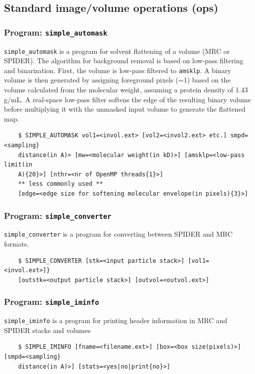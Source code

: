\documentclass[a4paper,11pt]{article}
\newcommand{\prgname}[1]{\textcolor{NavyBlue}{\texttt{#1}}}
\begin{document}
\subsection{Standard image/volume operations (ops)}

\subsubsection{Program: \prgname{simple\_automask}}
\label{automask}
\prgname{simple\_automask} is a program for solvent flattening of a volume (MRC or SPIDER). The algorithm for background removal is based on low-pass filtering and binarization. First, the volume is low-pass filtered to \texttt{amsklp}. A binary volume is then generated by assigning foreground pixels (=1) based on the volume calculated from the molecular weight, assuming a protein density of 1.43 g/mL. A real-space low-pass filter softens the edge of the resulting binary volume before multiplying it with the unmasked input volume to generate the flattened map.
\begin{verbatim}
    $ SIMPLE_AUTOMASK vol1=<invol.ext> [vol2=<invol2.ext> etc.] smpd=<sampling}
    distance(in A)> [mw=<molecular weight(in kD)>] [amsklp=<low-pass limit(in
    A){20}>] [nthr=<nr of OpenMP threads{1}>]
    ** less commonly used **
    [edge=<edge size for softening molecular envelope(in pixels){3}>]
\end{verbatim}

\subsubsection{Program: \prgname{simple\_converter}}
\label{converter}
\prgname{simple\_converter} is a program for converting between SPIDER and MRC formats.
\begin{verbatim}
    $ SIMPLE_CONVERTER [stk=<input particle stack>] [vol1=<invol.ext>]}
    [outstk=<output particle stack>] [outvol=<outvol.ext>]
\end{verbatim}

\subsubsection{Program: \prgname{simple\_iminfo}}
\label{iminfo}
\prgname{simple\_iminfo} is a program for printing header information in MRC and SPIDER stacks and volumes
\begin{verbatim}
    $ SIMPLE_IMINFO [fname=<filename.ext>] [box=<box size(pixels)>] [smpd=<sampling}
    distance(in A)>] [stats=<yes|no|print{no}>]
\end{verbatim}
\end{document}
